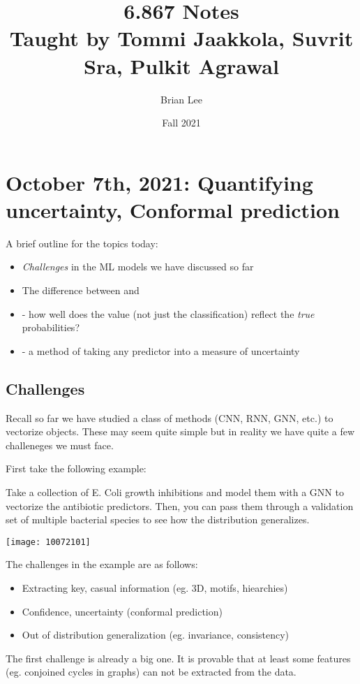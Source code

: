 \documentclass[11pt]{scrartcl}
\title{\Large 6.867 Notes\\ 
\large Taught by Tommi Jaakkola, Suvrit Sra, Pulkit Agrawal}
\subtitle{}
\author{\small Brian Lee}
\date{\small Fall 2021}
\begin{document}
\setcounter{section}{8}
\section{October 7th, 2021: Quantifying uncertainty, Conformal prediction}
A brief outline for the topics today:
\begin{itemize}
    \item \textit{Challenges} in the ML models we have discussed so far
    \item The difference between  and 
    \item {} - how well does the value (not just the classification) reflect the \textit{true} probabilities?
    \item {} - a method of taking any predictor into a measure of uncertainty
\end{itemize}

\subsection{Challenges}

Recall so far we have studied a class of methods (CNN, RNN, GNN, etc.) to vectorize objects. These may seem quite simple but in reality we have quite a few challeneges we must face. 

First take the following example:
\begin{ex}
Take a collection of E. Coli growth inhibitions and model them with a GNN to vectorize the antibiotic predictors. Then, you can pass them through a validation set of multiple bacterial species to see how the distribution generalizes. 
\begin{center}
    \texttt{[image: 10072101]}
\end{center}
\end{ex}

The challenges in the example are as follows:
\begin{itemize}
    \item Extracting key, casual information (eg. 3D, motifs, hiearchies)
    \item Confidence, uncertainty (conformal prediction)
    \item Out of distribution generalization (eg. invariance, consistency)
\end{itemize}

The first challenge is already a big one. It is provable that at least some features (eg. conjoined cycles in graphs) can not be extracted from the data. 
\end{document}
